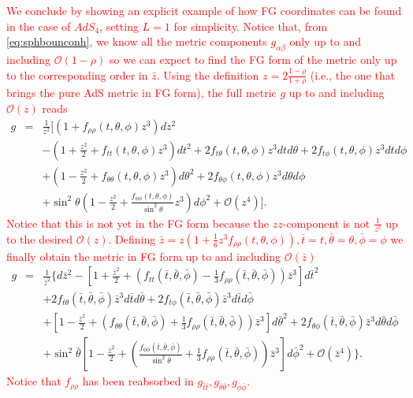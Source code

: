 \documentclass[a4paper,11pt]{article}
\numberwithin{equation}{section}
\begin{document}
\textcolor{red}{We conclude by showing an explicit example of how FG coordinates can be found in the case of $AdS_4$, setting $L=1$ for simplicity. Notice that, from  \eqref{eq:sphbounconh}, we know all the metric components $g_{\alpha\beta}$ only up to and including $\mathcal{O}(1-\rho)$ so we can expect to find the FG form of the metric only up to the corresponding order in $\bar{z}$.
Using the definition $z=2\frac{1-\rho}{1+\rho}$ (i.e., the one that brings the pure AdS metric in FG form), the full metric $g$ up to and including $\mathcal{O}(z)$ reads}
\begin{eqnarray}
g&=&\frac{1}{z^2}\biggl[ 
\left(1+f_{\rho\rho}(t,\theta,\phi)z^3\right)dz^2 \nonumber \\
&&- \left(1+\frac{z^2}{2}+f_{tt}(t,\theta,\phi)z^3\right)dt^2+ 2 f_{t\theta}(t,\theta,\phi)z^3dt d\theta + 2 f_{t\phi}(t,\theta,\phi) z^3dt d\phi  \nonumber \\
&&+  \left(1-\frac{z^2}{2}+f_{\theta\theta}(t,\theta,\phi)z^3 \right)d\theta^2+ 2 f_{\theta\phi}(t,\theta,\phi) z^3d\theta d\phi \nonumber\\
&&+  \sin^2\theta \left(1-\frac{z^2}{2}+\frac{f_{\phi\phi}(t,\theta,\phi)}{\sin^2\theta} z^3 \right)d\phi^2+\mathcal{O}(z^4)
\biggr].
\end{eqnarray}
\textcolor{red}{Notice that this is not yet in the FG form because the $zz$-component is not $\frac{1}{z^2}$ up to the desired $\mathcal{O}(z)$. Defining $\bar{z}=z\left(1+\frac{1}{6}z^3f_{\rho\rho}(t,\theta,\phi)\right),\bar{t}=t,\bar{\theta}=\theta,\bar{\phi}=\phi$ we finally obtain the metric in FG form up to and including $\mathcal{O}(\bar{z})$}
\begin{eqnarray}
g&=&\frac{1}{\bar{z}^2}\biggl\{ d\bar{z}^2- \left[1+\frac{\bar{z}^2}{2}+\left(f_{tt}(\bar{t},\bar{\theta},\bar{\phi})-\frac{1}{3}f_{\rho\rho}(\bar{t},\bar{\theta},\bar{\phi})\right)\bar{z}^3 \right]d\bar{t}^2 \nonumber \\
&&+ 2 f_{t\theta}(\bar{t},\bar{\theta},\bar{\phi})\bar{z}^3d\bar{t} d\bar{\theta} + 2 f_{t\phi}(\bar{t},\bar{\theta},\bar{\phi}) \bar{z}^3d\bar{t} d\bar{\phi}  \nonumber \\
&&+  \left[1-\frac{\bar{z}^2}{2}+\left(f_{\theta\theta}(\bar{t},\bar{\theta},\bar{\phi})+\frac{1}{3}f_{\rho\rho}(\bar{t},\bar{\theta},\bar{\phi})\right)\bar{z}^3 \right]d\bar{\theta}^2+ 2 f_{\theta\phi}(\bar{t},\bar{\theta},\bar{\phi}) \bar{z}^3d\bar{\theta} d\bar{\phi} \nonumber\\
&&+   \sin^2\bar{\theta} \left[1-\frac{\bar{z}^2}{2}+\left(\frac{f_{\phi\phi}(\bar{t},\bar{\theta},\bar{\phi})}{ \sin^2\bar{\theta}}+\frac{1}{3}f_{\rho\rho}(\bar{t},\bar{\theta},\bar{\phi})\right)\bar{z}^3\right]d\bar{\phi}^2+\mathcal{O}(\bar{z}^4)
\biggr\}.
\end{eqnarray}
\textcolor{red}{Notice that $f_{\rho\rho}$ has been reabsorbed in $g_{\bar{t}\bar{t}},g_{\bar{\theta}\bar{\theta}},g_{\bar{\phi}\bar{\phi}}$.}
\end{document}
